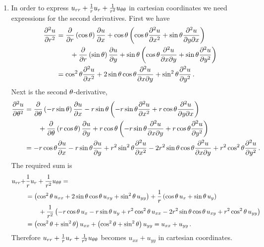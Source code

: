\begin{solution}
\begin{enumerate}
\item
In order to express $u_{rr} + \frac 1r u_r + \frac{1}{r^2}u_{\theta\theta}$ in cartesian coordinates we need expressions for the second derivatives. First we have
\begin{align*} 
\frac{\partial^2 u}{\partial r^2}
&= \frac{\partial}{\partial r} \left( \cos \theta\right) \frac{\partial u}{\partial x}
+ \cos \theta \left( \cos \theta \frac{\partial^2 u}{\partial x^2} + 
\sin \theta \frac{\partial^2 u}{\partial y \partial x} \right) \\
&\qquad + \frac{\partial}{\partial r} \left( \sin \theta\right) \frac{\partial u}{\partial y}
+ \sin \theta \left( \cos \theta \frac{\partial^2 u}{\partial x \partial y} + 
\sin \theta \frac{\partial^2 u}{\partial y^2} \right) \\
&= \cos^2 \theta \frac{\partial^2 u}{\partial x^2} + 2\sin \theta \cos \theta \frac{\partial^2 u}{\partial x \partial y}
+ \sin^2 \theta \frac{\partial^2 u}{\partial y^2}\,.
\end{align*}
Next is the second $\theta$-derivative,
\begin{align*}
\frac{\partial^2 u}{\partial \theta^2}
&= \frac{\partial}{\partial \theta} \left( -r \sin \theta\right) \frac{\partial u}{\partial x}
-r\sin \theta \left(-r \sin \theta \frac{\partial^2 u}{\partial x^2} + 
r \cos \theta \frac{\partial^2 u}{\partial y \partial x} \right) \\
&\qquad{} + \frac{\partial}{\partial \theta} \left( r \cos \theta\right) \frac{\partial u}{\partial y}
+ r \cos \theta \left( -r\sin \theta \frac{\partial^2 u}{\partial x \partial y} + 
r \cos \theta \frac{\partial^2 u}{\partial y^2} \right) \\
&= -r\cos \theta \frac{\partial u}{\partial x} - r \sin \theta \frac{\partial u}{\partial y}
+ r^2 \sin^2 \theta \frac{\partial^2 u}{\partial x^2} - 2r^2 \sin \theta \cos \theta \frac{\partial^2 u}{\partial x \partial y}
+ r^2 \cos^2 \theta \frac{\partial^2 u}{\partial y^2}\,.
\end{align*}
The required sum is
\begin{align*}
u_{rr} + &\frac{1}{r} u_r + \frac{1}{r^2} u_{\theta\theta} = \\
&= \left( \cos^2 \theta \, u_{xx} + 2 \sin \theta \cos \theta \, u_{xy}
+ \sin^2 \theta \, u_{yy} \right)
+ \frac{1}{r} \left( \cos \theta \, u_x + \sin \theta \, u_y \right) \\
&\qquad{} + \frac{1}{r^2} \left( -r\cos \theta \, u_x - r \sin \theta \, u_y 
+ r^2 \cos^2 \theta \, u_{xx} - 2r^2 \sin \theta \cos \theta \, u_{xy} 
+ r^2 \cos^2 \theta \, u_{yy} \right) \\
&= \left( \cos^2 \theta + \sin^2 \theta \right) u_{xx} + 
\left( \cos^2 \theta + \sin^2 \theta \right) u_{yy}
= u_{xx} + u_{yy}\,.
\end{align*}
Therefore $u_{rr} + \frac 1r u_r + \frac{1}{r^2}u_{\theta\theta}$ becomes $u_{xx} + u_{yy}$ in cartesian coordinates.
\end{enumerate}
\end{solution}

